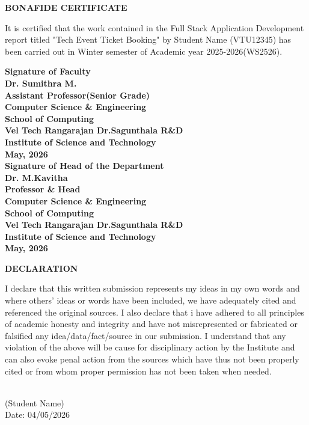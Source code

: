 \documentclass[12pt]{report}
\begin{document}
\newpage 
{} 
\begin{center} 
{\Huge \textbf{ BONAFIDE CERTIFICATE}}\\[0.5cm] 
\end{center} 
\linespread{1.5} 
\large{It is certified that the work contained in the Full Stack Application Development report titled "Tech Event Ticket Booking" by Student Name (VTU12345) has been carried out in Winter semester of Academic year 2025-2026(WS2526).} 
\vspace{1.5cm} 
\begin{flushright} 
\textbf{Signature of Faculty\\Dr. Sumithra M.\\Assistant Professor(Senior Grade)\\Computer Science \& 
Engineering\\School of Computing\\Vel Tech Rangarajan Dr.Sagunthala R\&D\\Institute of Science and Technology\\May, 2026}\\[2.0cm] 
\textbf{Signature of Head of the Department\\Dr. M.Kavitha\\Professor \& Head\\Computer Science \& Engineering\\School of Computing\\Vel Tech Rangarajan Dr.Sagunthala R\&D\\Institute of Science and Technology\\May, 2026}\\  
\end{flushright} 
 
\newpage 
\begin{center} 
\Huge \textbf{DECLARATION} 
\end{center} 
\linespread{1.5} 
\large{ 
 I declare that this written submission represents my ideas in my own words and where others' ideas or words have been included, we have adequately cited and referenced the original sources. I also declare that i have adhered to all principles of academic honesty and integrity and have not misrepresented or fabricated or falsified any idea/data/fact/source in our submission. I understand that any violation of the above will be cause for disciplinary action by the Institute and can also evoke penal action from the sources which have thus not been properly cited or from whom proper permission has not been taken when needed.} 
\vspace{2.0cm} 
\begin{flushright} 
\\ 
\large{(Student Name)}\\ 
\large{Date: 04/05/2026}\\[2.0cm] 
\\ 
\large{}\\ 
\large{}\\[2.0cm] 
\\ 
\large{}\\ 
\large{}\\[2.0cm] 
\end{flushright} 
\end{document}
